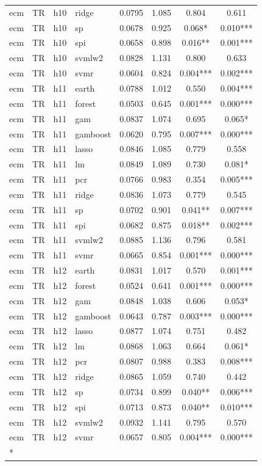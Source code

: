 \begin{ThreePartTable}
\begin{longtable}[t]{llclcccc}
ecm & TR & h10 & ridge & 0.0795 & 1.085 & 0.804 & 0.611\\
ecm & TR & h10 & sp & 0.0678 & 0.925 & 0.068* & 0.010***\\
ecm & TR & h10 & spi & 0.0658 & 0.898 & 0.016** & 0.001***\\
ecm & TR & h10 & svmlw2 & 0.0828 & 1.131 & 0.800 & 0.633\\
ecm & TR & h10 & svmr & 0.0604 & 0.824 & 0.004*** & 0.002***\\
\addlinespace
ecm & TR & h11 & earth & 0.0788 & 1.012 & 0.550 & 0.004***\\
ecm & TR & h11 & forest & 0.0503 & 0.645 & 0.001*** & 0.000***\\
ecm & TR & h11 & gam & 0.0837 & 1.074 & 0.695 & 0.065*\\
ecm & TR & h11 & gamboost & 0.0620 & 0.795 & 0.007*** & 0.000***\\
ecm & TR & h11 & lasso & 0.0846 & 1.085 & 0.779 & 0.558\\
ecm & TR & h11 & lm & 0.0849 & 1.089 & 0.730 & 0.081*\\
ecm & TR & h11 & pcr & 0.0766 & 0.983 & 0.354 & 0.005***\\
ecm & TR & h11 & ridge & 0.0836 & 1.073 & 0.779 & 0.545\\
ecm & TR & h11 & sp & 0.0702 & 0.901 & 0.041** & 0.007***\\
ecm & TR & h11 & spi & 0.0682 & 0.875 & 0.018** & 0.002***\\
ecm & TR & h11 & svmlw2 & 0.0885 & 1.136 & 0.796 & 0.581\\
ecm & TR & h11 & svmr & 0.0665 & 0.854 & 0.001*** & 0.000***\\
\addlinespace
ecm & TR & h12 & earth & 0.0831 & 1.017 & 0.570 & 0.001***\\
ecm & TR & h12 & forest & 0.0524 & 0.641 & 0.001*** & 0.000***\\
ecm & TR & h12 & gam & 0.0848 & 1.038 & 0.606 & 0.053*\\
ecm & TR & h12 & gamboost & 0.0643 & 0.787 & 0.003*** & 0.000***\\
ecm & TR & h12 & lasso & 0.0877 & 1.074 & 0.751 & 0.482\\
ecm & TR & h12 & lm & 0.0868 & 1.063 & 0.664 & 0.061*\\
ecm & TR & h12 & pcr & 0.0807 & 0.988 & 0.383 & 0.008***\\
ecm & TR & h12 & ridge & 0.0865 & 1.059 & 0.740 & 0.442\\
ecm & TR & h12 & sp & 0.0734 & 0.899 & 0.040** & 0.006***\\
ecm & TR & h12 & spi & 0.0713 & 0.873 & 0.040** & 0.010***\\
ecm & TR & h12 & svmlw2 & 0.0932 & 1.141 & 0.795 & 0.570\\
ecm & TR & h12 & svmr & 0.0657 & 0.805 & 0.004*** & 0.000***\\*
\end{longtable}
\end{ThreePartTable}
\endgroup{}
